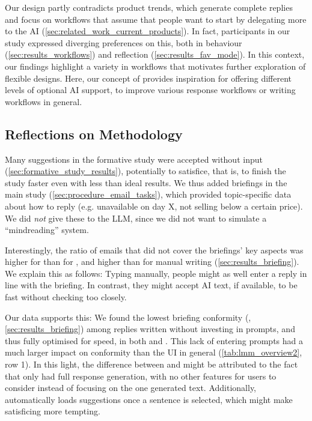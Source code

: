 Our design partly contradicts product trends, which generate complete replies and focus on workflows that assume that people want to start by delegating more to the AI (\cref{sec:related_work_current_products}). In fact, participants in our study expressed diverging preferences on this, both in behaviour (\cref{sec:results_workflows}) and reflection (\cref{sec:results_fav_mode}). In this context, our findings highlight a variety in workflows that motivates further exploration of flexible designs. Here, our concept of \modeours{} provides inspiration for offering different levels of optional AI support, to improve various response workflows or writing workflows in general. %




\subsection{Reflections on Methodology}\label{sec:discussion_methods}

Many suggestions in the formative study were accepted without input (\cref{sec:formative_study_results}), potentially to satisfice, that is, to finish the study faster even with less than ideal results. We thus added briefings in the main study (\cref{sec:procedure_email_tasks}), which provided topic-specific data about how to reply (e.g. unavailable on day X, not selling below a certain price). We did \textit{not} give these to the LLM, since we did not want to simulate a ``mindreading'' system. %
    
Interestingly, the ratio of emails that did not cover the briefings' key aspects was  higher for \modeours{} than for \modemailtxt, and  higher than for manual writing (\cref{sec:results_briefing}). 
We explain this as follows: Typing manually, people might as well enter a reply in line with the briefing. In contrast, they might accept AI text, if available, to be fast without checking too closely. 

Our data supports this: 
We found the lowest briefing conformity (, \cref{sec:results_briefing}) among replies written without investing in prompts, and thus fully optimised for speed, in both \modeours{} and \modemail{}. This lack of entering prompts had a much larger impact on conformity than the UI in general (\cref{tab:lmm_overview2}, row 1). In this light, the  difference between \modeours{} and \modemail{} might be attributed to the fact that \modemail{} only had full response generation, with no other features for users to consider instead of focusing on the one generated text. Additionally, \modeours{} automatically loads suggestions once a sentence is selected, which might make satisficing more tempting. 


